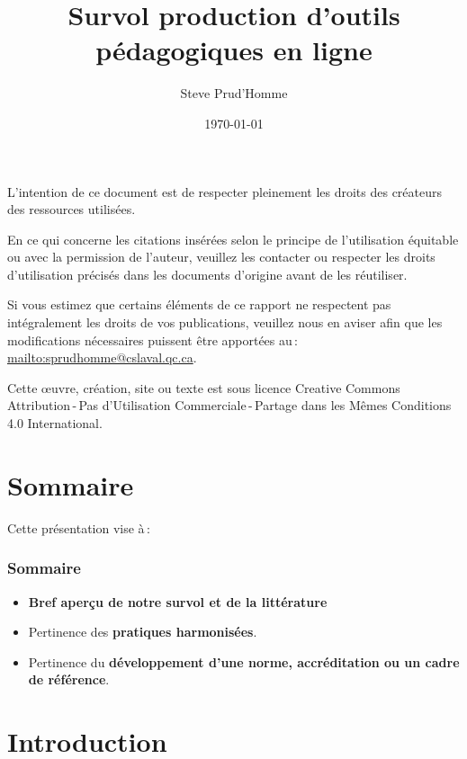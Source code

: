 	\title{Survol production d'outils pédagogiques en ligne} 
	\author{Steve Prud'Homme} 
	\date{\today} 

	
	
	\begin{frame}
	\end{frame}
	\frame{\titlepage} 
	
	\usebackgroundtemplate{ } 
	\par L’intention de ce document est de respecter pleinement les droits des créateurs des ressources
utilisées.
	\par En ce qui concerne les citations insérées selon le principe de l'utilisation équitable ou avec la permission de l'auteur, veuillez les contacter ou respecter les droits d’utilisation précisés dans les documents d’origine avant de les réutiliser.
	\par Si vous estimez que certains éléments de ce rapport ne respectent pas intégralement les droits de vos
publications, veuillez nous en aviser afin que les modifications nécessaires puissent être apportées au\,: \url{mailto:sprudhomme@cslaval.qc.ca}.
	\par Cette \oe uvre, création, site ou texte est sous licence Creative Commons Attribution\,-\,Pas d’Utilisation Commerciale\,-\,Partage dans les Mêmes Conditions 4.0 International.
	\section{Sommaire} 
		\begin{frame}
			Cette présentation vise à\,:
			\frametitle{Sommaire}
			\begin {itemize}
				\item \textbf{Bref aperçu de notre survol et de la littérature} 
				\item Pertinence des \textbf{pratiques harmonisées}.
				\item Pertinence du \textbf{développement d'une norme, accréditation ou un cadre de référence}.

			\end{itemize}
		\end{frame}


	\section{Introduction} 
		
